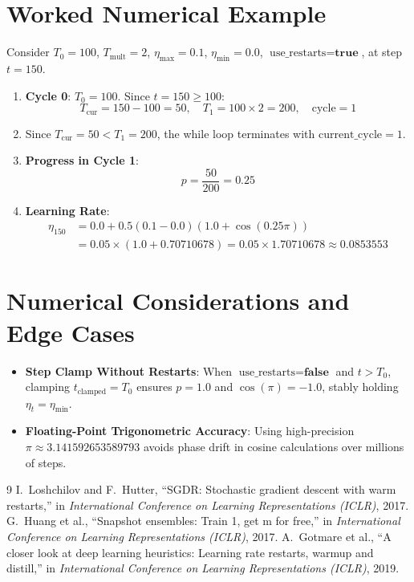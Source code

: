 \documentclass[11pt,a4paper]{article}
\theoremstyle{definition}
\begin{document}
\section{Worked Numerical Example}

Consider $T_0 = 100$, $T_{\text{mult}} = 2$, $\eta_{\max} = 0.1$, $\eta_{\min} = 0.0$, $\text{use\_restarts} = \textbf{true}$, at step $t = 150$.

\begin{enumerate}
    \item \textbf{Cycle 0}: $T_0 = 100$. Since $t=150 \ge 100$:
    \begin{equation}
    T_{\text{cur}} = 150 - 100 = 50, \quad T_1 = 100 \times 2 = 200, \quad \text{cycle} = 1
    \end{equation}
    \item Since $T_{\text{cur}} = 50 < T_1 = 200$, the while loop terminates with $\text{current\_cycle} = 1$.
    \item \textbf{Progress in Cycle 1}:
    \begin{equation}
    p = \frac{50}{200} = 0.25
    \end{equation}
    \item \textbf{Learning Rate}:
    \begin{align}
    \eta_{150} &= 0.0 + 0.5(0.1 - 0.0)(1.0 + \cos(0.25 \pi)) \\
    &= 0.05 \times (1.0 + 0.70710678) = 0.05 \times 1.70710678 \approx 0.0853553
    \end{align}
\end{enumerate}

\section{Numerical Considerations and Edge Cases}

\begin{itemize}
    \item \textbf{Step Clamp Without Restarts}: When $\text{use\_restarts} = \textbf{false}$ and $t > T_0$, clamping $t_{\text{clamped}} = T_0$ ensures $p=1.0$ and $\cos(\pi) = -1.0$, stably holding $\eta_t = \eta_{\min}$.
    \item \textbf{Floating-Point Trigonometric Accuracy}: Using high-precision $\pi \approx 3.141592653589793$ avoids phase drift in cosine calculations over millions of steps.
\end{itemize}

\begin{thebibliography}{9}
 I.~Loshchilov and F.~Hutter, ``SGDR: Stochastic gradient descent with warm restarts,'' in \emph{International Conference on Learning Representations (ICLR)}, 2017.
 G.~Huang et al., ``Snapshot ensembles: Train 1, get m for free,'' in \emph{International Conference on Learning Representations (ICLR)}, 2017.
 A.~Gotmare et al., ``A closer look at deep learning heuristics: Learning rate restarts, warmup and distill,'' in \emph{International Conference on Learning Representations (ICLR)}, 2019.
\end{thebibliography}
\end{document}

